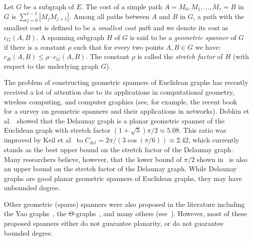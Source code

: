 \documentclass{stacs_proc}
\theoremstyle{plain}\newtheorem{satz}[thm]{Satz}
\begin{document}
Let $G$ be a subgraph of $E$. The cost of a simple path $A = M_0,
M_1, ..., M_r = B$ in $G$ is $\sum_{j=0}^{r-1} |M_jM_{j+1}|.$ Among
all paths between $A$ and $B$ in $G$, a path with the smallest cost
is defined to be a {\em smallest cost path} and we denote its cost
as $c_G(A,B)$. A spanning subgraph $H$ of $G$ is said to be a {\em geometric
spanner} of $G$ if there is a constant $\rho$ such that for every
two points $A,B \in G$ we have: $c_H(A,B) \leq \rho \cdot c_G(A,B)$.
The constant $\rho$ is called the {\em stretch factor} of $H$ (with
respect to the underlying graph $G$).

The problem of constructing geometric spanners of Euclidean graphs has
recently received a lot of attention due to its applications in
computational geometry, wireless computing, and computer graphics
(see, for example, the recent book~\cite{spannerbook} for a survey on
geometric spanners and their applications in networks). Dobkin et
al.~\cite{dobkin} showed that the Delaunay graph is a planar
geometric spanner of the Euclidean graph with stretch factor
$(1+\sqrt{5})\pi/2 \approx 5.08$. This ratio was improved by
Keil et al~\cite{keil} to $C_{del}=2\pi/(3\cos{(\pi/6)}) \approx
2.42$, which currently stands as the best upper bound on the stretch
factor of the Delaunay graph. Many researchers believe, however, that
the lower bound of $\pi/2$ shown in~\cite{chew} is also an upper
bound on the stretch factor of the Delaunay graph. While
Delaunay graphs are good planar geometric spanners of Euclidean
graphs, they may have unbounded degree. 

Other geometric (sparse) spanners were also proposed in the literature
including the Yao graphs~\cite{yao}, the $\Theta$-graphs~\cite{keil},
and many others (see~\cite{spannerbook}). However, most of these proposed
spanners either do not guarantee planarity, or do not guarantee bounded
degree.
\end{document}
